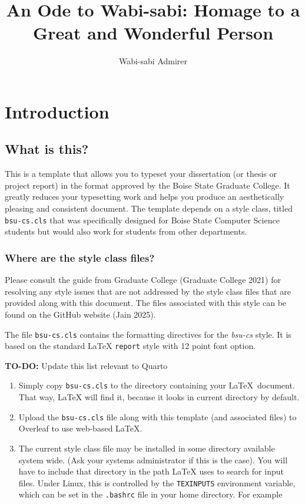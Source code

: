 \documentclass[
  dissertation]{bsu-cs}
\title{An Ode to Wabi-sabi: Homage to a Great and Wonderful Person}
\author{Wabi-sabi Admirer}
\providecommand{\tightlist}{%
  \setlength{\itemsep}{0pt}\setlength{\parskip}{0pt}}\usepackage{longtable,booktabs,array}
\renewcommand*\contentsname{Table of contents}
\newcommand\contentsname{Table of contents}
\begin{document}
\frontmatter

\buildFrontPages




\mainmatter
\section{Introduction}\label{sec-intro}

\subsection{What is this?}\label{what-is-this}

This is a template that allows you to typeset your dissertation (or
thesis or project report) in the format approved by the Boise State
Graduate College. It greatly reduces your typesetting work and helps you
produce an aesthetically pleasing and consistent document. The template
depends on a style class, titled \texttt{bsu-cs.cls} that was
specifically designed for Boise State Computer Science students but
would also work for students from other departments.

\subsubsection{Where are the style class
files?}\label{where-are-the-style-class-files}

Please consult the guide from Graduate College (Graduate College 2021)
for resolving any style issues that are not addressed by the style class
files that are provided along with this document. The files associated
with this style can be found on the GitHub website (Jain 2025).

The file \texttt{bsu-cs.cls} contains the formatting directives for the
\emph{bsu-cs} style. It is based on the standard LaTeX \texttt{report}
style with 12 point font option.

\textbf{TO-DO:} Update this list relevant to Quarto

\begin{enumerate}
\def\labelenumi{\arabic{enumi}.}
\tightlist
\item
  Simply copy \texttt{bsu-cs.cls} to the directory containing your
  \LaTeX~document. That way, LaTeX will find it, because it looks in
  current directory by default.
\item
  Upload the \texttt{bsu-cs.cls} file along with this template (and
  associated files) to Overleaf to use web-based LaTeX.
\item
  The current style class file may be installed in some directory
  available system wide. (Ask your systems administrator if this is the
  case). You will have to include that directory in the path LaTeX uses
  to search for input files. Under Linux, this is controlled by the
  \texttt{TEXINPUTS} environment variable, which can be set in the
  \texttt{.bashrc} file in your home directory. For example
\end{enumerate}
\end{document}
